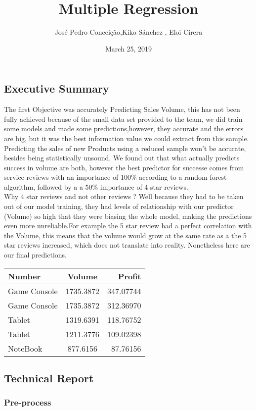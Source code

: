 \documentclass[]{article}
\title{Multiple Regression}
\author{José Pedro Conceição,Kiko Sánchez , Eloi Cirera}
\date{March 25, 2019}
\begin{document}
\maketitle

{
\setcounter{tocdepth}{5}
\tableofcontents
}
\subsection{Executive Summary}\label{executive-summary}

The first Objective was accurately Predicting Sales Volume, this has not
been fully achieved because of the small data set provided to the team,
we did train some models and made some predictions,however, they
accurate and the errors are big, but it was the best information value
we could extract from this sample. Predicting the sales of new Products
using a reduced sample won't be accurate, besides being statistically
unsound. We found out that what actually predicts success in volume are
both, however the best predictor for successe comes from service reviews
with an importance of 100\% according to a random forest algorithm,
followed by a a 50\% importance of 4 star reviews.\\
 Why 4 star reviews and not other reviews ? Well because they had to be
taken out of our model training, they had levels of relationship with
our predictor (Volume) so high that they were biasing the whole model,
making the predictions even more unreliable.For example the 5 star
review had a perfect correlation with the Volume, this means that the
volume would grow at the same rate as a the 5 star reviews increased,
which does not translate into reality. Nonetheless here are our final
predictions.

\begin{longtable}[]{@{}lcr@{}}
\toprule
Number & Volume & Profit\tabularnewline
\midrule
\endhead
Game Console & 1735.3872 & 347.07744\tabularnewline
Game Console & 1735.3872 & 312.36970\tabularnewline
Tablet & 1319.6391 & 118.76752\tabularnewline
Tablet & 1211.3776 & 109.02398\tabularnewline
NoteBook & 877.6156 & 87.76156\tabularnewline
\bottomrule
\end{longtable}

\subsection{Technical Report}\label{technical-report}

\subsubsection{Pre-process}\label{pre-process}
\end{document}
